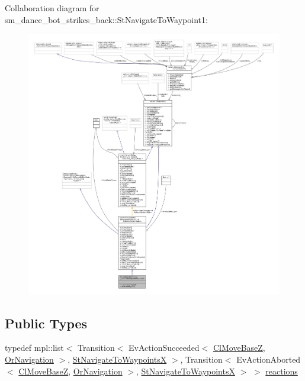 Collaboration diagram for sm\+\_\+dance\+\_\+bot\+\_\+strikes\+\_\+back\+:\+:St\+Navigate\+To\+Waypoint1\+:
\nopagebreak
\begin{figure}[H]
\begin{center}
\leavevmode
\includegraphics[width=350pt]{structsm__dance__bot__strikes__back_1_1StNavigateToWaypoint1__coll__graph}
\end{center}
\end{figure}
\subsection*{Public Types}
\begin{DoxyCompactItemize}
\item 
typedef mpl\+::list$<$ Transition$<$ Ev\+Action\+Succeeded$<$ \hyperlink{classmove__base__z__client_1_1ClMoveBaseZ}{Cl\+Move\+BaseZ}, \hyperlink{classsm__dance__bot__strikes__back_1_1OrNavigation}{Or\+Navigation} $>$, \hyperlink{structsm__dance__bot__strikes__back_1_1StNavigateToWaypointsX}{St\+Navigate\+To\+WaypointsX} $>$, Transition$<$ Ev\+Action\+Aborted$<$ \hyperlink{classmove__base__z__client_1_1ClMoveBaseZ}{Cl\+Move\+BaseZ}, \hyperlink{classsm__dance__bot__strikes__back_1_1OrNavigation}{Or\+Navigation} $>$, \hyperlink{structsm__dance__bot__strikes__back_1_1StNavigateToWaypointsX}{St\+Navigate\+To\+WaypointsX} $>$ $>$ \hyperlink{structsm__dance__bot__strikes__back_1_1StNavigateToWaypoint1_a6345cdcfe23da575ea59d70abe738ce1}{reactions}
\end{DoxyCompactItemize}
